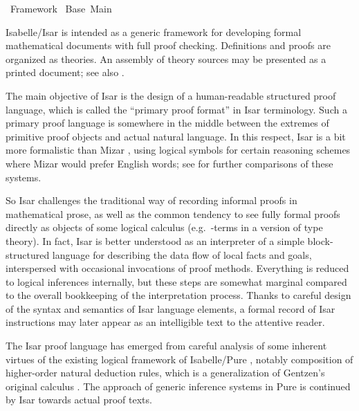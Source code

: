 %
\begin{isabellebody}%
\def\isabellecontext{Framework}%
%
\isadelimtheory
%
\endisadelimtheory
%
\isatagtheory
{}\isamarkupfalse%
\ Framework\isanewline
{}\ Base\ Main\isanewline
{}%
\endisatagtheory
{\isafoldtheory}%
%
\isadelimtheory
%
\endisadelimtheory
%
\isamarkuptrue%
%
\begin{isamarkuptext}%
Isabelle/Isar
  \cite{Wenzel:1999:TPHOL,Wenzel-PhD,Nipkow-TYPES02,Wenzel-Paulson:2006,Wenzel:2006:Festschrift}
  is intended as a generic framework for developing formal
  mathematical documents with full proof checking.  Definitions and
  proofs are organized as theories.  An assembly of theory sources may
  be presented as a printed document; see also
  .

  The main objective of Isar is the design of a human-readable
  structured proof language, which is called the ``primary proof
  format'' in Isar terminology.  Such a primary proof language is
  somewhere in the middle between the extremes of primitive proof
  objects and actual natural language.  In this respect, Isar is a bit
  more formalistic than Mizar
  \cite{Trybulec:1993:MizarFeatures,Rudnicki:1992:MizarOverview,Wiedijk:1999:Mizar},
  using logical symbols for certain reasoning schemes where Mizar
  would prefer English words; see \cite{Wenzel-Wiedijk:2002} for
  further comparisons of these systems.

  So Isar challenges the traditional way of recording informal proofs
  in mathematical prose, as well as the common tendency to see fully
  formal proofs directly as objects of some logical calculus (e.g.\
  -terms in a version of type theory).  In fact, Isar is
  better understood as an interpreter of a simple block-structured
  language for describing the data flow of local facts and goals,
  interspersed with occasional invocations of proof methods.
  Everything is reduced to logical inferences internally, but these
  steps are somewhat marginal compared to the overall bookkeeping of
  the interpretation process.  Thanks to careful design of the syntax
  and semantics of Isar language elements, a formal record of Isar
  instructions may later appear as an intelligible text to the
  attentive reader.

  The Isar proof language has emerged from careful analysis of some
  inherent virtues of the existing logical framework of Isabelle/Pure
  \cite{paulson-found,paulson700}, notably composition of higher-order
  natural deduction rules, which is a generalization of Gentzen's
  original calculus \cite{Gentzen:1935}.  The approach of generic
  inference systems in Pure is continued by Isar towards actual proof
  texts.


\end{isamarkuptext}
\end{isabellebody}
